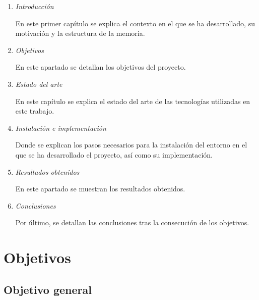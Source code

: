 \documentclass[a4paper, 12pt]{book}
\begin{document}
\begin{enumerate}
    \item \emph{Introducción}
    
    En este primer capítulo se explica el contexto en el que se ha desarrollado, su motivación y la estructura de la memoria.
    
    \item \emph{Objetivos}
    
    En este apartado se detallan los objetivos del proyecto.
    
    \item \emph{Estado del arte}
    
    En este capítulo se explica el estado del arte de las tecnologías utilizadas en este trabajo. 
    
    \item \emph{Instalación e implementación}
    
    Donde se explican los pasos necesarios para la instalación del entorno en el que se ha desarrollado el proyecto, así como su implementación.

       \item \emph{Resultados obtenidos}
    
    En este apartado se muestran los resultados obtenidos.
    
        \item \emph{Conclusiones}
    
    Por último, se detallan las conclusiones tras la consecución de los objetivos.
    
 \end{enumerate}


\cleardoublepage %
\chapter{Objetivos} %
\label{chap:objetivos} %

\section{Objetivo general} %
\label{sec:objetivo-general} %
\end{document}

